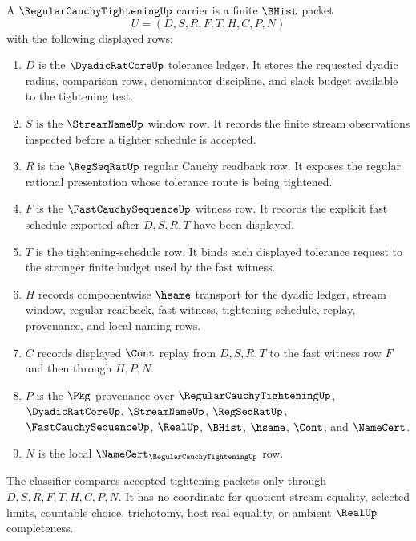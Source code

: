 \begin{definition}
\label{def:regular-cauchy-tightening-carrier}
A $\RegularCauchyTighteningUp$ carrier is a finite $\BHist$ packet
$$
U=(D,S,R,F,T,H,C,P,N)
$$
with the following displayed rows:
\begin{enumerate}
\item $D$ is the $\DyadicRatCoreUp$ tolerance ledger. It stores the requested dyadic radius, comparison rows, denominator discipline, and slack budget available to the tightening test.
\item $S$ is the $\StreamNameUp$ window row. It records the finite stream observations inspected before a tighter schedule is accepted.
\item $R$ is the $\RegSeqRatUp$ regular Cauchy readback row. It exposes the regular rational presentation whose tolerance route is being tightened.
\item $F$ is the $\FastCauchySequenceUp$ witness row. It records the explicit fast schedule exported after $D,S,R,T$ have been displayed.
\item $T$ is the tightening-schedule row. It binds each displayed tolerance request to the stronger finite budget used by the fast witness.
\item $H$ records componentwise $\hsame$ transport for the dyadic ledger, stream window, regular readback, fast witness, tightening schedule, replay, provenance, and local naming rows.
\item $C$ records displayed $\Cont$ replay from $D,S,R,T$ to the fast witness row $F$ and then through $H,P,N$.
\item $P$ is the $\Pkg$ provenance over $\RegularCauchyTighteningUp$, $\DyadicRatCoreUp$, $\StreamNameUp$, $\RegSeqRatUp$, $\FastCauchySequenceUp$, $\RealUp$, $\BHist$, $\hsame$, $\Cont$, and $\NameCert$.
\item $N$ is the local $\NameCert_{\RegularCauchyTighteningUp}$ row.
\end{enumerate}
The classifier compares accepted tightening packets only through $D,S,R,F,T,H,C,P,N$. It has no coordinate for quotient stream equality, selected limits, countable choice, trichotomy, host real equality, or ambient $\RealUp$ completeness.
\end{definition}

